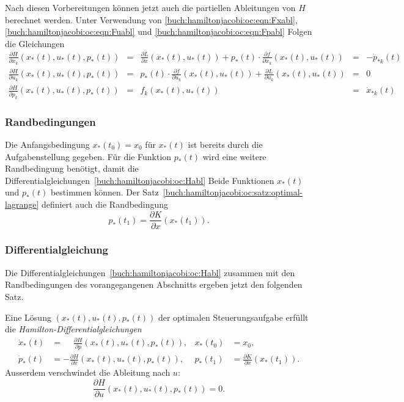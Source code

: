 Nach diesen Vorbereitungen können jetzt auch die partiellen Ableitungen
von $H$ berechnet werden.
Unter Verwendung von 
\eqref{buch:hamiltonjacobi:oc:eqn:Fxabl},
\eqref{buch:hamiltonjacobi:oc:eqn:Fuabl}
und
\eqref{buch:hamiltonjacobi:oc:eqn:Fpabl}
Folgen die Gleichungen
\begin{equation}
\renewcommand{\arraycolsep}{2pt}
\renewcommand{\arraystretch}{2.0}
\begin{array}{rclcl}
\displaystyle
\frac{\partial H}{\partial x_k}(x_*(t),u_*(t),p_*(t))
&=&
\displaystyle
\frac{\partial L}{\partial x}(x_*(t),u_*(t))
+
p_*(t)\cdot\frac{\partial f}{\partial x_k}(x_*(t),u_*(t))
&=&-\dot{p}_{*k}(t)
\\
\displaystyle
\frac{\partial H}{\partial u_k}(x_*(t),u_*(t),p_*(t))
&=&
\displaystyle
p_*(t)\cdot
\frac{\partial f}{\partial u_k}(x_*(t),u_*(t))
+
\frac{\partial L}{\partial u_k}(x_*(t),u_*(t))
&=&0
\\
\displaystyle
\frac{\partial H}{\partial p_k}(x_*(t),u_*(t),p_*(t))
&=&
f_k(x_*(t),u_*(t))
&=&
\dot{x}_{*k}(t)
\end{array}
\label{buch:hamiltonjacobi:oc:Habl}
\end{equation}

%
%
\subsubsection{Randbedingungen}
Die Anfangsbedingung $x_*(t_0)=x_0$ für $x_*(t)$ ist bereits durch
die Aufgabenstellung gegeben.
Für die Funktion $p_*(t)$ wird eine weitere Randbedingung benötigt,
damit die Differentialgleichungen~\eqref{buch:hamiltonjacobi:oc:Habl}
Beide Funktionen $x_*(t)$ und $p_*(t)$ bestimmen können.
Der Satz~\ref{buch:hamiltonjacobi:oc:satz:optimal-lagrange}
definiert auch die Randbedingung
\[
p_*(t_1)
=
\frac{\partial K}{\partial x}(x_*(t_1)).
\]

%
%
\subsubsection{Differentialgleichung}
Die Differentialgleichungen~\eqref{buch:hamiltonjacobi:oc:Habl} zusammen
mit den Randbedingungen des vorangegangenen Abschnitts ergeben jetzt
den folgenden Satz.

\begin{satz}
\label{buch:hamiltonjacobi:oc:satz:hamilton-gleichungen}
Eine Lösung $(x_*(t),u_*(t),p_*(t))$ der optimalen Steuerungsaufgabe
erfüllt die {\em Hamilton-Differentialgleichungen}
\begin{align*}
\dot{x}_*(t)
&=
\phantom{-}
\frac{\partial H}{\partial p}(x_*(t),u_*(t),p_*(t)),
&
x_*(t_0)
&=
x_0,
\\
\dot{p}_*(t)
&=
-
\frac{\partial H}{\partial x}(x_*(t),u_*(t),p_*(t)),
&
p_*(t_1)
&=
\frac{\partial K}{\partial x}(x_*(t_1)).
\end{align*}
Ausserdem verschwindet die Ableitung nach $u$:
\begin{equation}
\frac{\partial H}{\partial u}(x_*(t),u_*(t),p_*(t))=0.
\label{buch:hamiltonjacobi:oc:eqn:ablHu0}
\end{equation}
\end{satz}

